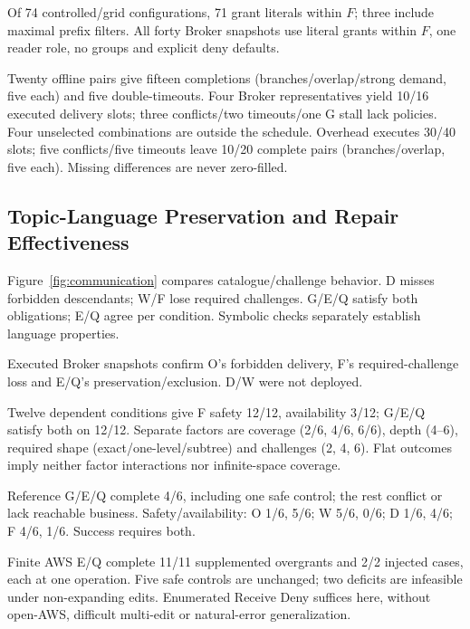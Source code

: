 \documentclass[letterpaper,journal]{IEEEtran}
\begin{document}
Of 74 controlled/grid configurations, 71 grant literals within $F$; three include maximal prefix filters. All forty Broker snapshots use literal grants within $F$, one reader role, no groups and explicit deny defaults.

Twenty offline pairs give fifteen completions (branches/overlap/strong demand, five each) and five double-timeouts. Four Broker representatives yield 10/16 executed delivery slots; three conflicts/two timeouts/one G stall lack policies. Four unselected combinations are outside the schedule. Overhead executes 30/40 slots; five conflicts/five timeouts leave 10/20 complete pairs (branches/overlap, five each). Missing differences are never zero-filled.



\subsection{Topic-Language Preservation and Repair Effectiveness}
Figure~\ref{fig:communication} compares catalogue/challenge behavior. D misses forbidden descendants; W/F lose required challenges. G/E/Q satisfy both obligations; E/Q agree per condition. Symbolic checks separately establish language properties.

Executed Broker snapshots confirm O's forbidden delivery, F's required-challenge loss and E/Q's preservation/exclusion. D/W were not deployed.



Twelve dependent conditions give F safety 12/12, availability 3/12; G/E/Q satisfy both on 12/12. Separate factors are coverage (2/6, 4/6, 6/6), depth (4--6), required shape (exact/one-level/subtree) and challenges (2, 4, 6). Flat outcomes imply neither factor interactions nor infinite-space coverage.

Reference G/E/Q complete 4/6, including one safe control; the rest conflict or lack reachable business. Safety/availability: O 1/6, 5/6; W 5/6, 0/6; D 1/6, 4/6; F 4/6, 1/6. Success requires both.

Finite AWS E/Q complete 11/11 supplemented overgrants and 2/2 injected cases, each at one operation. Five safe controls are unchanged; two deficits are infeasible under non-expanding edits. Enumerated Receive Deny suffices here, without open-AWS, difficult multi-edit or natural-error generalization.
\end{document}
